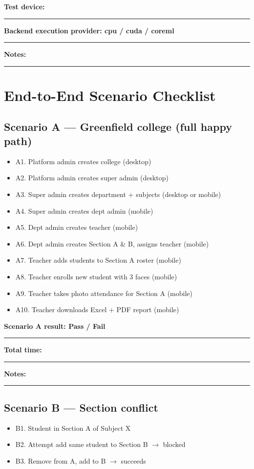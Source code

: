 \documentclass[11pt,a4paper,oneside]{article}
\newcommand{\chk}{\fbox{\rule{0pt}{1.05ex}\rule{1.05ex}{0pt}}}
\newcommand{\fillin}[1][3.5cm]{\rule{#1}{0.4pt}}
\newcommand{\fillinlong}{\rule{0.72\textwidth}{0.4pt}}
\newcommand{\notesblock}{\par\smallskip\noindent\textbf{Notes:}\ \fillinlong\par\smallskip}
\newcommand{\fieldline}[1]{\par\smallskip\noindent\textbf{#1}\ \fillin\par}
\begin{document}
\fieldline{Test device:}
\fieldline{Backend execution provider: cpu / cuda / coreml}
\notesblock

\section{End-to-End Scenario Checklist}

\subsection{Scenario A — Greenfield college (full happy path)}

\begin{itemize}[leftmargin=2em, itemsep=0.25em]
  \item[\chk] A1. Platform admin creates college (desktop)
  \item[\chk] A2. Platform admin creates super admin (desktop)
  \item[\chk] A3. Super admin creates department + subjects (desktop or mobile)
  \item[\chk] A4. Super admin creates dept admin (mobile)
  \item[\chk] A5. Dept admin creates teacher (mobile)
  \item[\chk] A6. Dept admin creates Section A \& B, assigns teacher (mobile)
  \item[\chk] A7. Teacher adds students to Section A roster (mobile)
  \item[\chk] A8. Teacher enrolls new student with 3 faces (mobile)
  \item[\chk] A9. Teacher takes photo attendance for Section A (mobile)
  \item[\chk] A10. Teacher downloads Excel + PDF report (mobile)
\end{itemize}

\fieldline{Scenario A result: Pass / Fail}
\fieldline{Total time:}
\notesblock

\subsection{Scenario B — Section conflict}

\begin{itemize}[leftmargin=2em, itemsep=0.25em]
  \item[\chk] B1. Student in Section A of Subject X
  \item[\chk] B2. Attempt add same student to Section B $\rightarrow$ blocked
  \item[\chk] B3. Remove from A, add to B $\rightarrow$ succeeds
\end{itemize}
\end{document}

